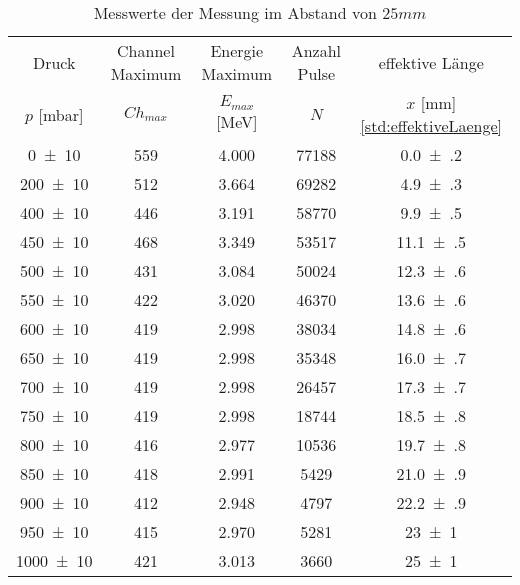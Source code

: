 \begin{table}[!h]
	\centering
	\begin{tabular}{|c|c|c|c|c|}
		\hline
		Druck & Channel Maximum & Energie Maximum & Anzahl Pulse& effektive Länge\\
		$p$ [\si{\milli\bar}] & $Ch_{max}$ & $E_{max}$ [\si{\mega\eV}] & $N$&  $x$ [\si{\milli\meter}] \cref{std:effektiveLaenge}\\
\hline\hline
		\num{0(10)} & \num{559} & \num{4.000} & \num{77188}&\num{0.0(2)} \\
		\num{200(10)} & \num{512} & \num{3.664} & \num{69282}& \num{4.9(3)}\\
		\num{400(10)} & \num{446} & \num{3.191} & \num{58770}& \num{9.9(5)}\\
		\num{450(10)} & \num{468} & \num{3.349} & \num{53517}& \num{11.1(5)}\\
		\num{500(10)} & \num{431} & \num{3.084} & \num{50024}& \num{12.3(6)}\\
		\num{550(10)} & \num{422} & \num{3.020} & \num{46370}& \num{13.6(6)}\\
		\num{600(10)} & \num{419} & \num{2.998} & \num{38034}& \num{14.8(6)}\\
		\num{650(10)} & \num{419} & \num{2.998} & \num{35348}& \num{16.0(7)}\\
		\num{700(10)} & \num{419} & \num{2.998} & \num{26457}& \num{17.3(7)}\\
		\num{750(10)} & \num{419} & \num{2.998} & \num{18744}& \num{18.5(8)}\\
		\num{800(10)} & \num{416} & \num{2.977} & \num{10536}& \num{19.7(8)}\\
		\num{850(10)} & \num{418} & \num{2.991} & \num{5429}& \num{21.0(9)}\\
		\num{900(10)} & \num{412} & \num{2.948} & \num{4797}& \num{22.2(9)}\\
		\num{950(10)} & \num{415} & \num{2.970} & \num{5281}& \num{23(1)}\\
		\num{1000(10)} & \num{421} & \num{3.013} & \num{3660}& \num{25(1)}\\
		\hline
	\end{tabular}
	\caption{Messwerte der Messung im Abstand von $25 \si{mm}$ \label{tab:Messwerte_II}}
\end{table}
